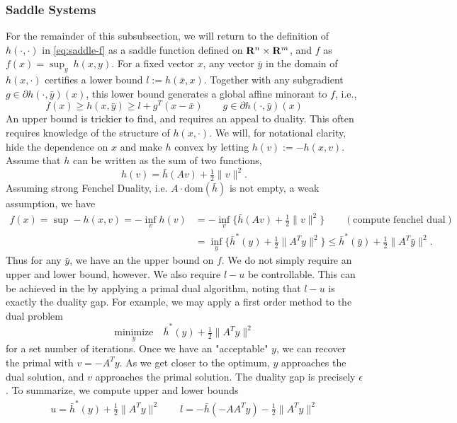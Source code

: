 \subsubsection{Saddle Systems} For the remainder of this subsubsection, we will return to the definition of $h(\cdot, \cdot)$ in \ref{eq:saddle-f} as a saddle function defined on $\mathbf{R}^n \times \mathbf{R}^m$, and $f$ as $f(x) = \sup_y\ h(x,y)$. For a fixed vector $x$, any vector $\bar{y}$ in the domain of $h(x,\cdot)$
certifies a lower bound $l:=h(\bar{x},x)$. Together with any subgradient
$g\in\partial h(\cdot,\bar{y})(x)$, this lower bound generates a global affine
minorant to $f$, i.e.,
\[
  f(x) \geq h(x, \bar{y}) \ge l + g^T(x-\bar{x}) \qquad g\in\partial h(\cdot,\bar{y})(x) \qquad
\]
An upper bound is trickier to find, and requires an appeal to duality. This
often requires knowledge of the structure of $h(x, \cdot)$. We will, for
notational clarity, hide the dependence on $x$ and make $h$ convex by letting $ h(v) := -h(x,v). $
Assume that $h$ can be written as the sum of two functions,
\begin{equation}\label{eq:seperable_form_h}
h(v) = \bar{h}(Av) + \tfrac{1}{2}\|v\|^2.
\end{equation}
Assuming strong Fenchel Duality, i.e. $A \cdot \mbox{dom}(\bar{h})$ is not empty,
a weak assumption, we have
\begin{align*}
f(x) = \sup -h(x,v) = -\inf_{v}h(v) 
 & =-\inf_{v}\{\bar{h}(Av)+\tfrac{1}{2}\|v\|^{2}\} 
 \qquad (\mbox{compute fenchel dual})\\ 
 & =\inf_{y}\{\bar{h}^*(y)+\tfrac{1}{2}\|A^{T}y\|^{2}\}
 \leq\bar{h}^*(\bar{y})+\tfrac{1}{2}\|A^{T}\bar{y}\|^{2}.
\end{align*}
Thus for any $\bar{y}$, we have an the upper bound on $f$. 
We do not simply require an upper and lower bound, however. We also require
$l-u$ be controllable. This can be achieved in the by applying a
primal dual algorithm, noting that $l-u$ is exactly the duality gap.
For example, we may apply a first order method to the dual problem
$$
\underset{y}{\mbox{minimize}}\quad \bar{h}^*(y)+\tfrac{1}{2}\|A^{T}y\|^{2}
$$
for a set number of iterations. Once we have an "acceptable" $y$, we can
recover the primal with $v=-A^{T}y$. As we get closer to the optimum, $y$
approaches the dual solution, and $v$ approaches the primal solution. The
duality gap is precisely $\epsilon$. To summarize, we compute upper and lower
bounds
\begin{align*}
u =\bar{h}^*(y)+\tfrac{1}{2}\|A^{T}y\|^{2} \qquad 
l =-\bar{h}(-AA^Ty)-\tfrac{1}{2}\|A^Ty\|^{2}
\end{align*}
